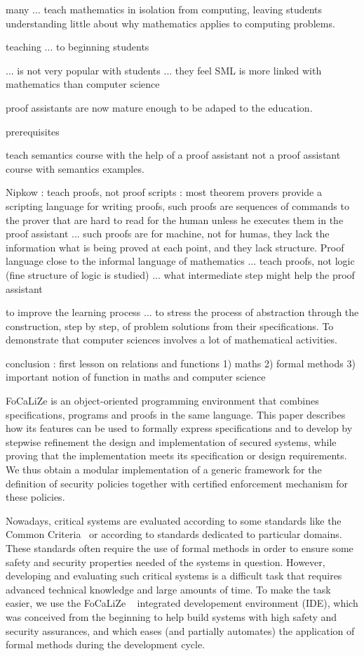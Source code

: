 \documentclass[submission,copyright,creativecommons]{eptcs}
\def\focalize{FoCaLiZe \mbox{}}
\begin{document}
many ... teach mathematics in isolation from computing, leaving
students understanding little about why mathematics applies to
computing problems.

teaching ... to beginning students

... is not very popular with students ... they feel SML is more linked
with mathematics than computer science


proof assistants are now mature enough to be adaped to the education.


prerequisites

teach semantics course with the help of a proof assistant not a proof
assistant course with semantics examples.

Nipkow : teach proofs, not proof scripts : most theorem provers
provide a scripting language for writing proofs, such proofs are
sequences of commands to the prover that are hard to read for the
human unless he executes them in the proof assistant ... such proofs
are for machine, not for humas, they lack the information what is
being proved at each point, and they lack structure. Proof language
close to the informal language of mathematics ... teach proofs, not
logic (fine structure of logic is studied) ... what intermediate step
might help the proof assistant

to improve the learning process ... to stress the process of
abstraction through the construction, step by step, of problem
solutions from their specifications. To demonstrate that computer
sciences involves a lot of mathematical activities. 

conclusion : first lesson on relations and functions 1) maths 2)
formal methods 3) important notion of function in maths and computer science



\focalize is an object-oriented programming environment that
combines specifications, programs and proofs in the same language.
This paper describes how its features can be used to
formally express specifications and to develop by stepwise refinement
the design and implementation of secured systems,
while proving that the implementation meets its specification or design
requirements.  We thus obtain
a modular implementation of a generic framework
for the definition of security policies together with certified
enforcement mechanism for these policies.

Nowadays,
critical systems are evaluated according to some standards like the
Common Criteria~\cite{CC2} or
according to standards dedicated
to particular domains.
These standards often
require the use of formal methods in order to ensure some safety and
security properties needed of the systems in question.
However, developing and evaluating such critical systems is a
difficult task that
requires advanced technical knowledge and large amounts of time.
To make the task easier, we use
the \focalize~\cite{foc03} integrated
developement environment (IDE), 
which was conceived from the
beginning to help build systems with high
safety and security assurances,  and which eases (and partially automates)
the application of formal methods during the development cycle.
\end{document}
